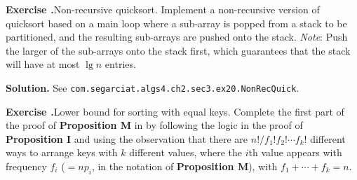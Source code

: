 \documentclass[12pt, a4paper]{article}
\newenvironment{ex}[2][Exercise]
{\par\medskip\noindent \textbf{#1 #2.}}
{\medskip}
\newenvironment{sol}[1][Solution]
{\par\medskip\noindent \textbf{#1.} }
{\medskip}
\begin{document}
	\begin{ex}{20}
		\emph{Non-recursive quicksort}. Implement a non-recursive version of quicksort based on
		a main loop where a sub-array is popped from a stack to be partitioned, and the
		resulting sub-arrays are pushed onto the stack. \emph{Note}: Push the larger of the
		sub-arrays onto the stack first, which guarantees that the stack will have at most
		$\lg n$ entries.
	\end{ex}
	\begin{sol}
		See \texttt{com.segarciat.algs4.ch2.sec3.ex20.NonRecQuick}.
	\end{sol}
	\begin{ex}{21}
		\emph{Lower bound for sorting with equal keys}. Complete the first part of the proof
		of \textbf{Proposition M} in \cite{sedgewick_wayne} by following the logic in
		the proof of \textbf{Proposition I} and using the observation that there are
		$n!/f_1!f_2!\cdots f_k!$ different ways to arrange keys with $k$ different
		values, where the $i$th value appears with frequency $f_i$ ($=np_i$, in the
		notation of \textbf{Proposition M}), with $f_1+\cdots+f_k=n$.
	\end{ex}
\end{document}
